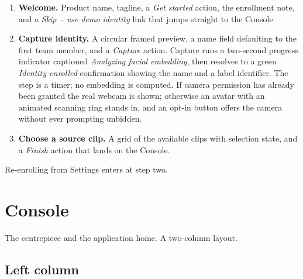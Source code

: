 \documentclass[11pt,a4paper]{report}
\begin{document}
\begin{enumerate}
  \item \textbf{Welcome.} Product name, tagline, a \emph{Get started} action,
    the enrollment note, and a \emph{Skip -- use demo identity} link that
    jumps straight to the Console.
  \item \textbf{Capture identity.} A circular framed preview, a name field
    defaulting to the first team member, and a \emph{Capture} action. Capture
    runs a two-second progress indicator captioned \emph{Analyzing facial
    embedding}, then resolves to a green \emph{Identity enrolled} confirmation
    showing the name and a label identifier. The step is a timer; no embedding
    is computed. If camera permission has already been granted the real webcam
    is shown; otherwise an avatar with an animated scanning ring stands in, and
    an opt-in button offers the camera without ever prompting unbidden.
  \item \textbf{Choose a source clip.} A grid of the available clips with
    selection state, and a \emph{Finish} action that lands on the Console.
\end{enumerate}

Re-enrolling from Settings enters at step two.

\section{Console}

The centrepiece and the application home. A two-column layout.

\subsection*{Left column}
\end{document}
